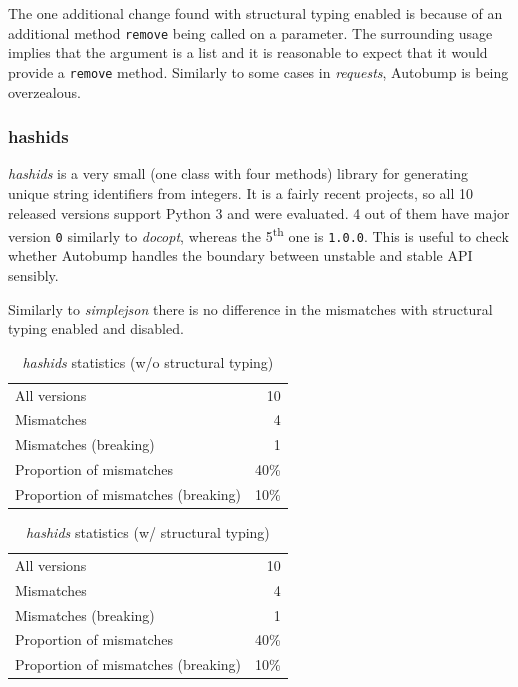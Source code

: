 \documentclass{l4proj}
\newcommand\genericstyle{\lstset{basicstyle=\ttm}}
\newcommand\codeinline[1]{{\genericstyle\lstinline!#1!}}
\begin{document}
The one additional change found with structural typing enabled is
because of an additional method \codeinline{remove} being called on a
parameter. The surrounding usage implies that the argument is a list
and it is reasonable to expect that it would provide a
\codeinline{remove} method. Similarly to some cases in
\textit{requests}, Autobump is being overzealous.

\subsubsection{hashids}

\textit{hashids} is a very small (one class with four methods) library
for generating unique string identifiers from integers. It is a fairly
recent projects, so all 10 released versions support Python 3 and were
evaluated. 4 out of them have major version \codeinline{0} similarly
to \textit{docopt}, whereas the 5\textsuperscript{th} one is
\codeinline{1.0.0}. This is useful to check whether Autobump handles
the boundary between unstable and stable API sensibly.

Similarly to \textit{simplejson} there is no difference in the
mismatches with structural typing enabled and disabled.

\noindent
\begin{minipage}[t]{0.5\textwidth}
\begin{table}[H]
\centering
\begin{tabular}{|lr|}
All versions & 10 \\
Mismatches & 4 \\
Mismatches (breaking) & 1 \\
Proportion of mismatches & 40\% \\
Proportion of mismatches (breaking) & 10\% \\
\end{tabular}
\caption{\textit{hashids} statistics (w/o structural typing)}
\label{HashidsNonStructural}
\end{table}
\end{minipage}
\begin{minipage}[t]{0.5\textwidth}
\begin{table}[H]
\centering
\begin{tabular}{|lr|}
All versions & 10 \\
Mismatches & 4 \\
Mismatches (breaking) & 1 \\
Proportion of mismatches & 40\% \\
Proportion of mismatches (breaking) & 10\% \\
\end{tabular}
\caption{\textit{hashids} statistics (w/ structural typing)}
\label{HashidsStructural}
\end{table}
\end{minipage}
\end{document}
